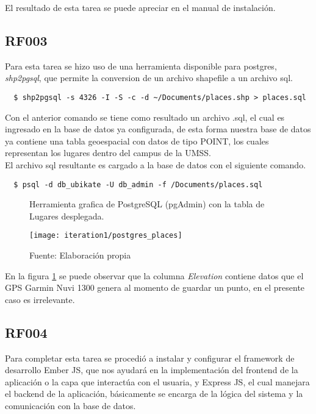 El resultado de esta tarea se puede apreciar en el manual de instalación.\\

\subsection{RF003}
\label{sub:RF003}

Para esta tarea se hizo uso de una herramienta disponible para postgres, \emph{shp2pgsql}, que permite la conversion de un archivo shapefile a un archivo sql.

\begin{verbatim}
  $ shp2pgsql -s 4326 -I -S -c -d ~/Documents/places.shp > places.sql
\end{verbatim}

Con el anterior comando se tiene como resultado un archivo .sql, el cual es ingresado en la base de datos ya configurada, de esta forma nuestra base de datos ya contiene una tabla geoespacial con datos de tipo POINT, los cuales representan los lugares dentro del campus de la UMSS.\\

El archivo sql resultante es cargado a la base de datos con el siguiente comando.\\

\begin{verbatim}
  $ psql -d db_ubikate -U db_admin -f /Documents/places.sql
\end{verbatim}

\begin{figure}[H]
  \begin{center}
    \caption{Herramienta grafica de PostgreSQL (pgAdmin) con la tabla de Lugares desplegada.}
    \label{fig:postgres_places}
    \texttt{[image: iteration1/postgres\_places]}
    \caption*{Fuente: Elaboración propia}
  \end{center}
\end{figure}

En la figura \ref{fig:postgres_places} se puede observar que la columna \emph{Elevation} contiene datos que el GPS Garmin Nuvi 1300 genera al momento de guardar un punto, en el presente caso es irrelevante.\\

\subsection{RF004}
\label{sub:RF004}

Para completar esta tarea se procedió a instalar y configurar el framework de desarrollo Ember JS, que nos ayudará en la implementación del frontend de la aplicación o la capa que interactúa con el usuaria, y Express JS, el cual manejara el backend de la aplicación, básicamente se encarga de la lógica del sistema y la comunicación con la base de datos.\\

